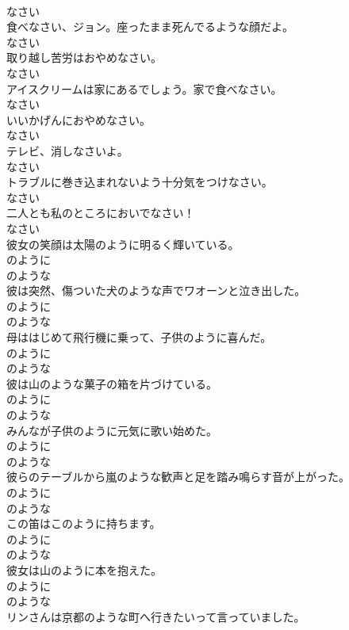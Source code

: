 \documentclass[8pt]{extreport}
\begin{document}
\begin{CJK}{UTF8}{min}
\\	なさい
\\	食べなさい、ジョン。座ったまま死んでるような顔だよ。	
\\	なさい
\\	取り越し苦労はおやめなさい。	
\\	なさい
\\	アイスクリームは家にあるでしょう。家で食べなさい。	
\\	なさい
\\	いいかげんにおやめなさい。	
\\	なさい
\\	テレビ、消しなさいよ。	
\\	なさい
\\	トラブルに巻き込まれないよう十分気をつけなさい。	
\\	なさい
\\	二人とも私のところにおいでなさい！	
\\	なさい
\\	彼女の笑顔は太陽のように明るく輝いている。	
\\	のように 
\\	のような
\\	彼は突然、傷ついた犬のような声でワオーンと泣き出した。	
\\	のように 
\\	のような
\\	母ははじめて飛行機に乗って、子供のように喜んだ。	
\\	のように 
\\	のような
\\	彼は山のような菓子の箱を片づけている。	
\\	のように 
\\	のような
\\	みんなが子供のように元気に歌い始めた。	
\\	のように 
\\	のような
\\	彼らのテーブルから嵐のような歓声と足を踏み鳴らす音が上がった。	
\\	のように 
\\	のような
\\	この笛はこのように持ちます。	
\\	のように 
\\	のような
\\	彼女は山のように本を抱えた。	
\\	のように 
\\	のような
\\	リンさんは京都のような町へ行きたいって言っていました。	

\end{CJK}
\end{document}
